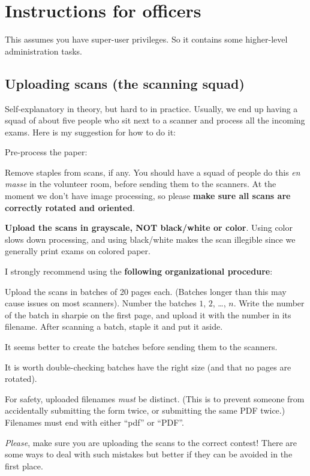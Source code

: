 \chapter{Instructions for officers}
This assumes you have super-user privileges.
So it contains some higher-level administration tasks.

\section{Uploading scans (the scanning squad)}
Self-explanatory in theory, but hard to in practice.
Usually, we end up having a squad of about five people
who sit next to a scanner and process all the incoming exams.
Here is my suggestion for how to do it:
\begin{itemize}
	\ii Pre-process the paper:
	\begin{itemize}
		\ii Remove staples from scans, if any.
		You should have a squad of people do this \emph{en masse}
		in the volunteer room, before sending them to the scanners.
		\ii At the moment we don't have image processing,
		so please \textbf{make sure all scans are correctly rotated and oriented}.
	\end{itemize}

	\ii \textbf{\color{red} Upload the scans in grayscale, NOT black/white or color}.
	Using color slows down processing, and using black/white makes the scan
	illegible since we generally print exams on colored paper.

	\ii I strongly recommend using the \textbf{following organizational procedure}:
	\begin{itemize}
		\ii Upload the scans in batches of 20 pages each.
		(Batches longer than this may cause issues on most scanners).
		\ii Number the batches $1$, $2$, \dots, $n$.
		Write the number of the batch in sharpie on the first page,
		and upload it with the number in its filename.
		\ii After scanning a batch, staple it and put it aside.
	\end{itemize}
	It seems better to create the batches before sending
	them to the scanners.

	It is worth double-checking batches have the right size
	(and that no pages are rotated).

	\ii For safety, uploaded filenames \emph{must} be distinct.
	(This is to prevent someone from accidentally submitting the form twice,
	or submitting the same PDF twice.)
	Filenames must end with either ``pdf'' or ``PDF''.

	\ii \emph{Please}, make sure you are uploading the scans
	to the correct contest!
	There are some ways to deal with such mistakes but better
	if they can be avoided in the first place.
\end{itemize}

